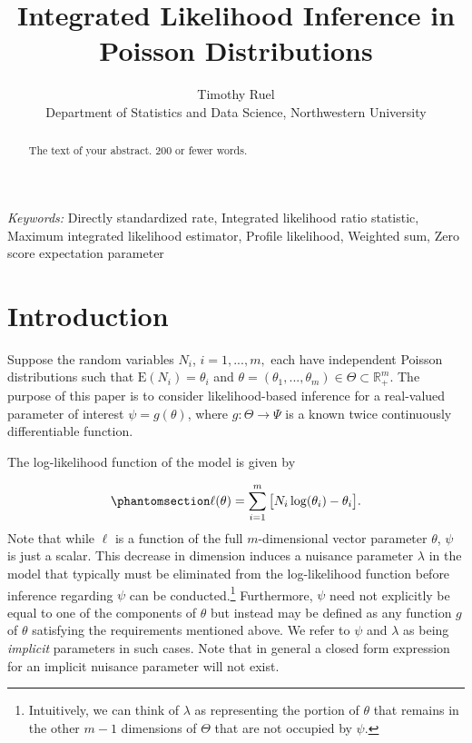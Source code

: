 \documentclass[
  12pt]{article}
\begin{document}
\def\spacingset#1{\renewcommand{\baselinestretch}%
{#1}\small\normalsize} \spacingset{1}



\title{\bf Integrated Likelihood Inference in Poisson Distributions}
\author{
Timothy Ruel\\
Department of Statistics and Data Science, Northwestern University\\
}
\maketitle

\bigskip
\bigskip
\begin{abstract}
The text of your abstract. 200 or fewer words.
\end{abstract}

\noindent%
{\it Keywords:} Directly standardized rate, Integrated likelihood ratio
statistic, Maximum integrated likelihood estimator, Profile
likelihood, Weighted sum, Zero score expectation parameter
\vfill

\newpage
\spacingset{1.9} %

\section{Introduction}\label{sec-intro}

Suppose the random variables \(N_i\), \(i = 1, ..., m,\) each have
independent Poisson distributions such that \(\text{E}(N_i) = \theta_i\)
and
\(\theta = (\theta_1, ..., \theta_m) \in \Theta \subset \mathbb{R}^m_+\).
The purpose of this paper is to consider likelihood-based inference for
a real-valued parameter of interest \(\psi = g(\theta)\), where
\(g: \Theta \to \Psi\) is a known twice continuously differentiable
function.

The log-likelihood function of the model is given by

\begin{equation}\phantomsection\label{eq-1}{
\ell(\theta) = \sum_{i=1}^m \big[N_i \log(\theta_i) - \theta_i\big].
}\end{equation} Note that while \(\ell\) is a function of the full
\(m\)-dimensional vector parameter \(\theta\), \(\psi\) is just a
scalar. This decrease in dimension induces a nuisance parameter
\(\lambda\) in the model that typically must be eliminated from the
log-likelihood function before inference regarding \(\psi\) can be
conducted.\footnote{Intuitively, we can think of \(\lambda\) as
  representing the portion of \(\theta\) that remains in the other
  \(m-1\) dimensions of \(\Theta\) that are not occupied by \(\psi\).}
Furthermore, \(\psi\) need not explicitly be equal to one of the
components of \(\theta\) but instead may be defined as any function
\(g\) of \(\theta\) satisfying the requirements mentioned above. We
refer to \(\psi\) and \(\lambda\) as being \emph{implicit} parameters in
such cases. Note that in general a closed form expression for an
implicit nuisance parameter will not exist.
\end{document}
